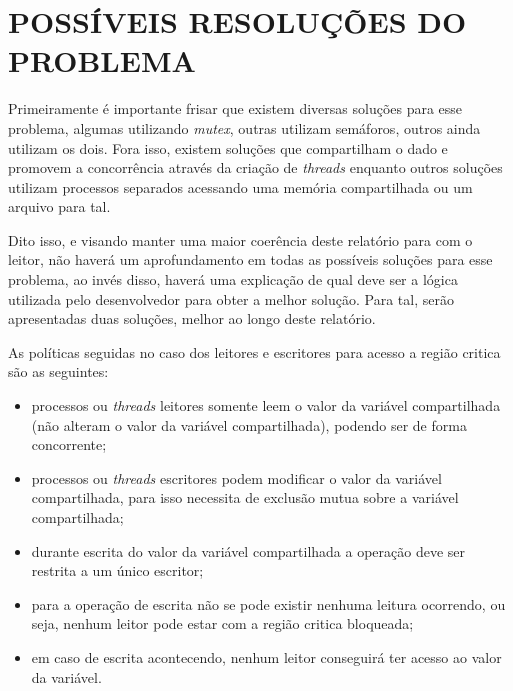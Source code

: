 \section{\normalsize POSSÍVEIS RESOLUÇÕES DO PROBLEMA}
	Primeiramente é importante frisar que existem diversas soluções para esse problema, algumas utilizando \textit{mutex}, outras utilizam semáforos, outros ainda utilizam os dois. Fora isso, existem soluções que compartilham o dado e promovem a concorrência através da criação de \textit{threads} enquanto outros soluções utilizam processos separados acessando uma memória compartilhada ou um arquivo para tal.
	
	Dito isso, e visando manter uma maior coerência deste relatório para com o leitor, não haverá um aprofundamento em todas as possíveis soluções para esse problema, ao invés disso, haverá uma explicação de qual deve ser a lógica utilizada pelo desenvolvedor para obter a melhor solução. Para tal, serão apresentadas duas soluções, melhor ao longo deste relatório.
	
	As políticas seguidas no caso dos leitores e escritores para acesso a região critica são as seguintes: 
	\begin{itemize}
		\item processos ou \textit{threads} leitores somente leem o valor da variável compartilhada (não alteram o valor da variável compartilhada), podendo ser de forma concorrente; 
		
		\item processos ou \textit{threads} escritores podem modificar o valor da variável compartilhada, para isso necessita de exclusão mutua sobre a variável compartilhada; 
		
		\item durante escrita do valor da variável compartilhada a operação deve ser restrita a um único escritor; 
		
		\item para a operação de escrita não se pode existir nenhuma leitura ocorrendo, ou seja, nenhum leitor pode estar com a região critica bloqueada; 
		
		\item em caso de escrita acontecendo, nenhum leitor conseguirá ter acesso ao valor da variável.

	\end{itemize}		
	
